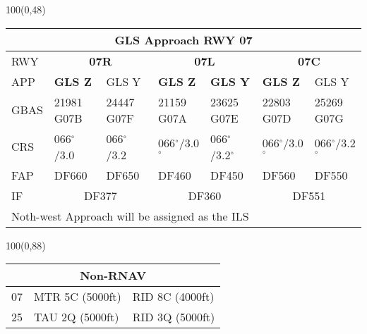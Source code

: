 \documentclass[10pt,landscape,a4paper]{article}
\begin{document}
\begin{textblock}{100}(0,48)
\begin{table}[]
\begin{tabular}{|l|l|l|l|l|l|l|}
\multicolumn{7}{c}{\textbf{GLS Approach RWY 07}} \\ \hline
RWY  & \multicolumn{2}{c|}{\textbf{07R}} & \multicolumn{2}{c|}{\textbf{07L}} & \multicolumn{2}{c|}{\textbf{07C}} \\ \hline
APP  & \textbf{GLS Z} & GLS Y & \textbf{GLS Z} & \textbf{GLS Y} & \textbf{GLS Z} & GLS Y \\
GBAS & 21981 G07B & 24447 G07F & 21159 G07A & 23625 G07E & 22803 G07D & 25269 G07G \\
CRS  & 066$^\circ$/3.0 & 066$^\circ$/3.2 & 066$^\circ$/3.0$^\circ$ & 066$^\circ$/3.2$^\circ$ & 066$^\circ$/3.0$^\circ$ & 066$^\circ$/3.2$^\circ$ \\
FAP  & DF660 & DF650 & DF460 & DF450 & DF560 & DF550 \\ \hline
IF   & \multicolumn{2}{c|}{DF377} & \multicolumn{2}{c|}{DF360} & \multicolumn{2}{c|}{DF551} \\ \hline
\multicolumn{6}{l}{Noth-west Approach will be assigned as the ILS}\\
\end{tabular}
\end{table}
\end{textblock}

\begin{textblock}{100}(0,88)
\begin{table}[]
\begin{tabular}{|l|l|l|}
\multicolumn{3}{c}{\textbf{Non-RNAV}} \\ \hline
07  & MTR 5C (5000ft)    & RID 8C (4000ft)   \\ \hline
25  & TAU 2Q (5000ft)    & RID 3Q (5000ft)   \\ \hline
\end{tabular}
\end{table}
\end{textblock}
\end{document}
